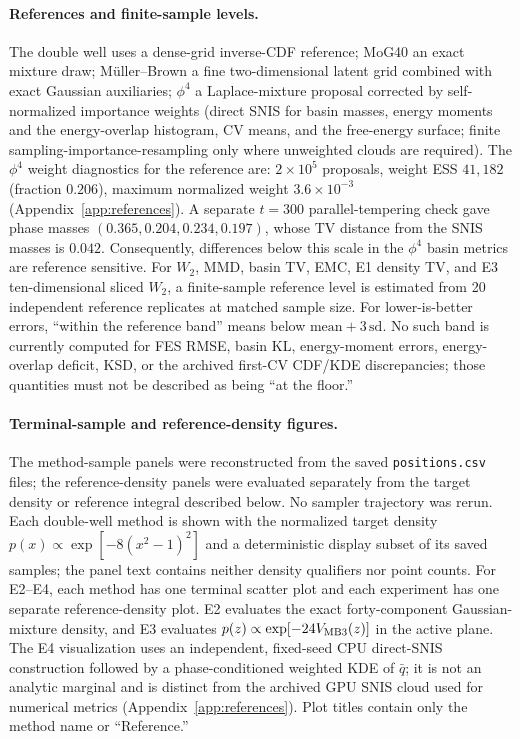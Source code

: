 \documentclass[11pt]{article}
\begin{document}
\paragraph{References and finite-sample levels.}
The double well uses a dense-grid inverse-CDF reference; MoG40 an exact
mixture draw; M\"uller--Brown a fine two-dimensional latent grid combined
with exact Gaussian auxiliaries; $\phi^4$ a Laplace-mixture proposal corrected
by self-normalized importance weights (direct SNIS for basin masses, energy
moments and the energy-overlap histogram, CV means, and the free-energy
surface; finite
sampling-importance-resampling only where unweighted clouds are required).
The $\phi^4$ weight diagnostics for the reference are: $2\times
10^5$ proposals, weight ESS $41{,}182$ (fraction $0.206$), maximum normalized
weight $3.6\times10^{-3}$ (Appendix~\ref{app:references}).  A separate
$t=300$ parallel-tempering check gave phase masses
$(0.365,0.204,0.234,0.197)$, whose TV distance from the SNIS masses is
$0.042$.  Consequently, differences below this scale in the $\phi^4$ basin
metrics are reference sensitive.  For $W_2$, MMD, basin TV, EMC, E1 density
TV, and E3 ten-dimensional sliced $W_2$, a finite-sample reference level is
estimated from 20 independent reference replicates at matched sample size.
For lower-is-better errors, ``within the reference band'' means below
$\text{mean}+3\,\text{sd}$.  No such band is currently computed for FES RMSE,
basin KL, energy-moment errors, energy-overlap deficit, KSD, or the archived
first-CV CDF/KDE discrepancies; those quantities must not be described as
being ``at the floor.''

\paragraph{Terminal-sample and reference-density figures.}
The method-sample panels were reconstructed from the saved
\texttt{positions.csv} files; the reference-density panels were evaluated
separately from the target density or reference integral described below.  No
sampler trajectory was rerun.  Each double-well method is shown with the
normalized target density
$p(x)\propto\exp[-8(x^2-1)^2]$ and a deterministic display subset of its saved
samples; the panel text contains neither density qualifiers nor point counts.
For E2--E4, each method has one terminal scatter
plot and each experiment has one separate reference-density plot.  E2 evaluates
the exact forty-component Gaussian-mixture density, and E3 evaluates
$p(z)\propto\exp[-24V_{\rm MB3}(z)]$ in the active plane.  The E4 visualization
uses an independent, fixed-seed CPU direct-SNIS construction followed by a
phase-conditioned weighted KDE of $\bar q$; it is not an analytic marginal and
is distinct from the archived GPU SNIS cloud used for numerical metrics
(Appendix~\ref{app:references}).  Plot titles contain only the method name or
``Reference.''
\end{document}
